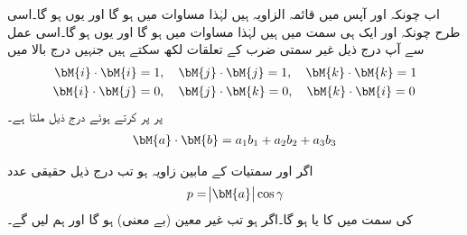 اب چونکہ  اور  آپس میں قائمہ الزاویہ ہیں لہٰذا مساوات  میں  ہو گا اور یوں  ہو گا۔اسی طرح چونکہ  اور  ایک ہی سمت میں ہیں  لہٰذا مساوات  میں  ہو گا اور یوں  ہو گا۔اسی عمل سے آپ درج ذیل  غیر سمتی ضرب کے تعلقات لکھ سکتے ہیں جنہیں درج بالا میں
\begin{align}
\bM{i}\cdot\bM{i}&=1,\quad \bM{j}\cdot\bM{j}=1,\quad \bM{k}\cdot\bM{k}=1\\
\bM{i}\cdot\bM{j}&=0,\quad \bM{j}\cdot\bM{k}=0,\quad \bM{k}\cdot\bM{i}=0
\end{align}
پر پر کرتے ہوئے درج ذیل ملتا ہے۔
\begin{align}\label{مساوات_الجبرا_غیر_سمتی_ضرب_اجزاء}
\bM{a}\cdot \bM{b}=a_1b_1+a_2b_2+a_3b_3
\end{align}

اگر  اور   سمتیات کے مابین زاویہ  ہو تب درج ذیل حقیقی عدد
\begin{align*}
p=\abs{\bM{a}}\cos \gamma
\end{align*}
 کی سمت میں  کا  یا  ہو گا۔اگر  ہو تب  غیر معین (بے معنی) ہو گا اور ہم  لیں گے۔

